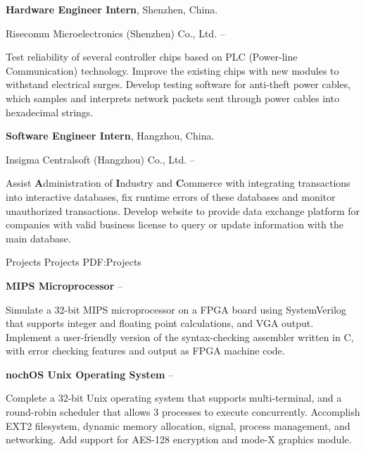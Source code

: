 \documentclass[letterpaper,MMMyyyy,nonstopmode]{simpleresumecv}
\begin{document}
\begin{Body}
\Entry
\textbf{Hardware Engineer Intern}, Shenzhen, China.

\Gap
\BulletItem
Risecomm Microelectronics (Shenzhen) Co., Ltd.
\hfill
{} --
\begin{Detail}
\SubBulletItem
Test reliability of several controller chips based on PLC (Power-line Communication) technology. Improve the existing chips with new modules to withstand electrical surges.
\SubBulletItem
Develop testing software for anti-theft power cables, which samples and interprets network packets sent through power cables into hexadecimal strings.
\end{Detail}

\Entry
\textbf{Software Engineer Intern}, Hangzhou, China.

\Gap
\BulletItem
Insigma Centralsoft (Hangzhou) Co., Ltd.
\hfill
{} --
\begin{Detail}
\SubBulletItem
Assist \textbf{A}dministration of \textbf{I}ndustry and \textbf{C}ommerce with integrating transactions into interactive databases, fix runtime errors of these databases and monitor unauthorized transactions.
\SubBulletItem
Develop website to provide data exchange platform for companies with valid business license to query or update information with the main database.
\end{Detail}

\Section
{Projects}
{Projects}
{PDF:Projects}

\Entry
\textbf{MIPS Microprocessor}
\hfill
{} --
\Gap

\begin{Detail}
\BulletItem
Simulate a 32-bit MIPS microprocessor on a FPGA board using SystemVerilog that supports integer and floating point calculations, and VGA output.
\BulletItem
Implement a user-friendly version of the syntax-checking assembler written in C, with error checking features and output as FPGA machine code.
\end{Detail}


\Entry
\textbf{nochOS Unix Operating System}
\hfill
{} --
\Gap

\begin{Detail}
\BulletItem
Complete a 32-bit Unix operating system that supports multi-terminal, and a round-robin scheduler that allows 3 processes to execute concurrently.
\BulletItem
Accomplish EXT2 filesystem, dynamic memory allocation, signal, process management, and networking. Add support for AES-128 encryption and mode-X graphics module.
\end{Detail}



\end{Body}
\end{document}
